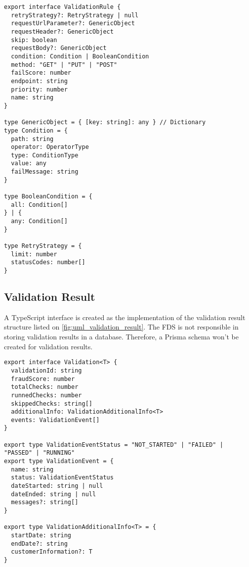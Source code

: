       \begin{lstlisting}[style=es6, caption={TypeScript interface of a validation rule (TypeScript)}]
export interface ValidationRule {
  retryStrategy?: RetryStrategy | null
  requestUrlParameter?: GenericObject
  requestHeader?: GenericObject
  skip: boolean
  requestBody?: GenericObject
  condition: Condition | BooleanCondition
  method: "GET" | "PUT" | "POST" 
  failScore: number
  endpoint: string
  priority: number
  name: string
}

type GenericObject = { [key: string]: any } // Dictionary
type Condition = {
  path: string
  operator: OperatorType
  type: ConditionType
  value: any
  failMessage: string
}

type BooleanCondition = {
  all: Condition[]
} | {
  any: Condition[]
}

type RetryStrategy = {
  limit: number
  statusCodes: number[] 
}
\end{lstlisting}

  \subsection{Validation Result}
  
    A TypeScript interface is created as the implementation of the validation result structure listed on \autoref{fig:uml_validation_result}. The FDS is not responsible in storing validation results in a database. Therefore, a Prisma schema won't be created for validation results. 

    \newpage
    \begin{lstlisting}[style=es6, caption={TypeScript interface of a validation result (TypeScript)}]
export interface Validation<T> {
  validationId: string
  fraudScore: number
  totalChecks: number
  runnedChecks: number
  skippedChecks: string[]
  additionalInfo: ValidationAdditionalInfo<T>
  events: ValidationEvent[]
}

export type ValidationEventStatus = "NOT_STARTED" | "FAILED" | "PASSED" | "RUNNING"
export type ValidationEvent = {
  name: string
  status: ValidationEventStatus
  dateStarted: string | null
  dateEnded: string | null
  messages?: string[]
}

export type ValidationAdditionalInfo<T> = {
  startDate: string
  endDate?: string
  customerInformation?: T
}
\end{lstlisting}